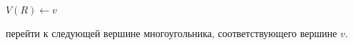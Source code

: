 \documentclass[a4paper,12pt]{article}
\begin{document}
\begin{algorithm}
    \begin{algorithmic}
                \State $V(R) \gets v$
            \EndIf
        \EndProcedure

        \Statex
                \State {}
            \EndIf
            \State перейти к следующей вершине многоугольника, соответствующего вершине $v$.
        \EndProcedure
    \end{algorithmic}
\end{algorithm}
\end{document}
